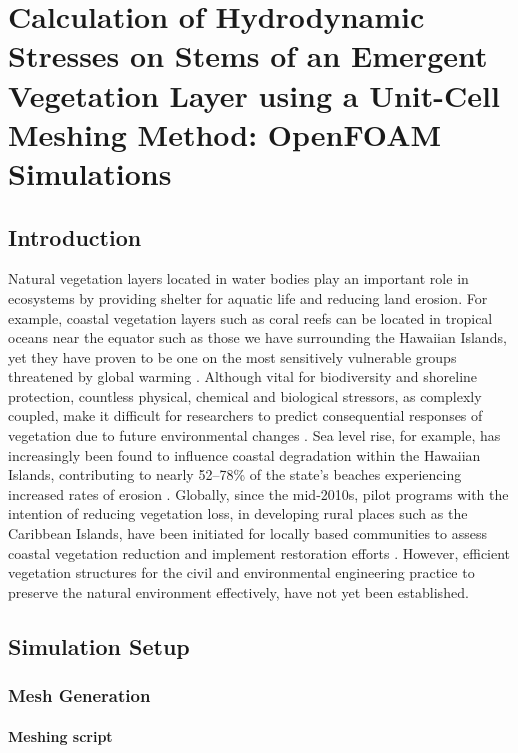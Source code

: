 
\chapter{Calculation of Hydrodynamic Stresses on Stems of an Emergent Vegetation
Layer using a Unit-Cell Meshing Method: OpenFOAM Simulations}

\section{Introduction}

Natural vegetation layers located in water bodies play an important
role in ecosystems by providing shelter for aquatic life and reducing
land erosion. For example, coastal vegetation layers such as coral
reefs can be located in tropical oceans near the equator such as those
we have surrounding the Hawaiian Islands, yet they have proven to
be one on the most sensitively vulnerable groups threatened by global
warming \citep{silbiger_environmental_2017}. Although vital for biodiversity
and shoreline protection, countless physical, chemical and biological
stressors, as complexly coupled, make it difficult for researchers
to predict consequential responses of vegetation due to future environmental
changes \citep{zhu_biomechanical_2019,folkard_biophysical_2019}.
Sea level rise, for example, has increasingly been found to influence
coastal degradation within the Hawaiian Islands, contributing to nearly
52--78\% of the state\textquoteright s beaches experiencing increased
rates of erosion \citep{romine_are_2013}. Globally, since the mid-2010s,
pilot programs with the intention of reducing vegetation loss, in
developing rural places such as the Caribbean Islands, have been initiated
for locally based communities to assess coastal vegetation reduction
and implement restoration efforts \citep{reguero_coral_2018}. However,
efficient vegetation structures for the civil and environmental engineering
practice to preserve the natural environment effectively, have not
yet been established. 

\section{Simulation Setup}

\subsection{Mesh Generation}

\subsubsection{Meshing script}

